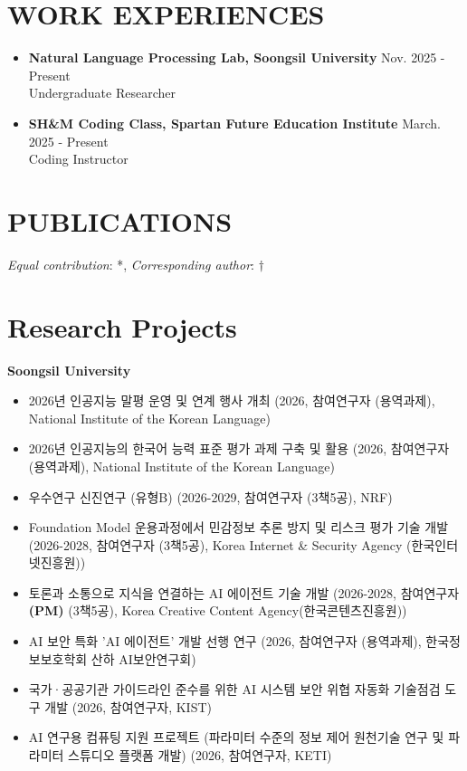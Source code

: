 \documentclass[10pt,a4paper]{article} %
\newcommand{\seclabel}[1]{\section*{\uppercase{#1}}}
\newcommand{\cvitem}[2]{\textbf{#1} \hfill \small{#2}\\}
\begin{document}
\seclabel{Work Experiences}
\begin{itemize}[left=0pt]
    \item \cvitem{Natural Language Processing Lab, Soongsil University}{\small{Nov. 2025 - Present}}\small{Undergraduate Researcher}
    \item \cvitem{SH\&M Coding Class, Spartan Future Education Institute}{\small{March. 2025 - Present}}\small{Coding Instructor}
\end{itemize}

\newpage


\seclabel{Publications}
\textit{Equal contribution}: *, \textit{Corresponding author}: $\dagger$

\vspace{0.8em}



\vspace{1.0em}


\section{Research Projects}
\textbf{Soongsil University}
\begin{itemize}[left=0pt]
    \item \small 2026년 인공지능 말평 운영 및 연계 행사 개최 (2026, 참여연구자 (용역과제), National Institute of the Korean Language)
    \item \small 2026년 인공지능의 한국어 능력 표준 평가 과제 구축 및 활용 (2026, 참여연구자 (용역과제), National Institute of the Korean Language)
    \item \small 우수연구 신진연구 (유형B) (2026-2029, 참여연구자 (3책5공), NRF)
    \item \small Foundation Model 운용과정에서 민감정보 추론 방지 및 리스크 평가 기술 개발 (2026-2028, 참여연구자 (3책5공), Korea Internet \& Security Agency (한국인터넷진흥원))
    \item \small 토론과 소통으로 지식을 연결하는 AI 에이전트 기술 개발 (2026-2028, 참여연구자\textbf{(PM)} (3책5공), Korea Creative Content Agency(한국콘텐츠진흥원))
    \item \small AI 보안 특화 'AI 에이전트' 개발 선행 연구 (2026,  참여연구자 (용역과제), 한국정보보호학회 산하 AI보안연구회)
    \item \small 국가·공공기관 가이드라인 준수를 위한 AI 시스템 보안 위협 자동화 기술점검 도구 개발 (2026, 참여연구자, KIST)
    \item \small AI 연구용 컴퓨팅 지원 프로젝트 (파라미터 수준의 정보 제어 원천기술 연구 및 파라미터 스튜디오 플랫폼 개발) (2026,  참여연구자, KETI)
\end{itemize}
\end{document}
